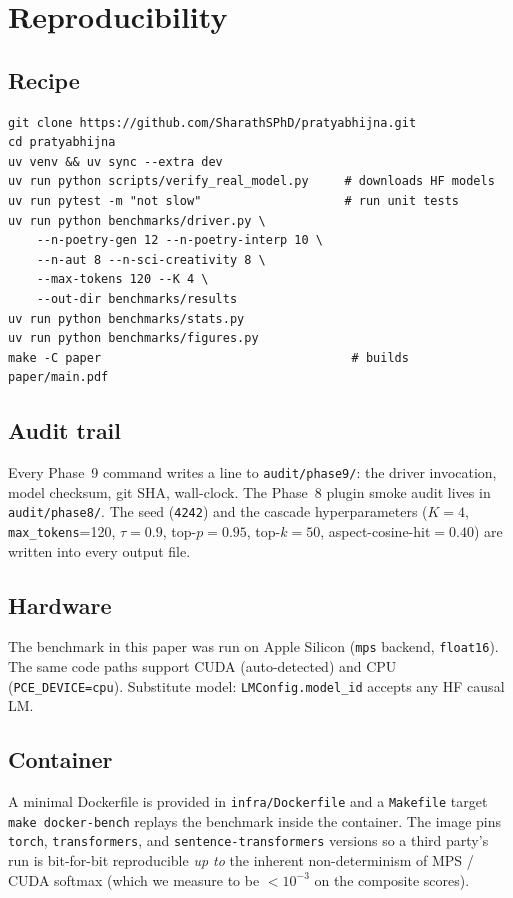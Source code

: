 \section{Reproducibility}\label{app:reproducibility}

\sloppy

\subsection{Recipe}

\begin{verbatim}
git clone https://github.com/SharathSPhD/pratyabhijna.git
cd pratyabhijna
uv venv && uv sync --extra dev
uv run python scripts/verify_real_model.py     # downloads HF models
uv run pytest -m "not slow"                    # run unit tests
uv run python benchmarks/driver.py \
    --n-poetry-gen 12 --n-poetry-interp 10 \
    --n-aut 8 --n-sci-creativity 8 \
    --max-tokens 120 --K 4 \
    --out-dir benchmarks/results
uv run python benchmarks/stats.py
uv run python benchmarks/figures.py
make -C paper                                   # builds paper/main.pdf
\end{verbatim}

\subsection{Audit trail}

Every Phase~9 command writes a line to \texttt{audit/phase9/}: the driver invocation, model checksum, git SHA, wall-clock. The Phase~8 plugin smoke audit lives in \texttt{audit/phase8/}. The seed (\texttt{4242}) and the cascade hyperparameters ($K=4$, \texttt{max\_tokens}=120, $\tau=0.9$, top-$p=0.95$, top-$k=50$, aspect-cosine-hit$=0.40$) are written into every output file.

\subsection{Hardware}

The benchmark in this paper was run on Apple Silicon (\texttt{mps} backend, \texttt{float16}). The same code paths support CUDA (auto-detected) and CPU (\texttt{PCE\_DEVICE=cpu}). Substitute model: \texttt{LMConfig.model\_id} accepts any HF causal LM.

\subsection{Container}

A minimal Dockerfile is provided in \texttt{infra/Dockerfile} and a \texttt{Makefile} target \texttt{make docker-bench} replays the benchmark inside the container. The image pins \texttt{torch}, \texttt{transformers}, and \texttt{sentence-transformers} versions so a third party's run is bit-for-bit reproducible \emph{up to} the inherent non-determinism of MPS / CUDA softmax (which we measure to be $<10^{-3}$ on the composite scores).
